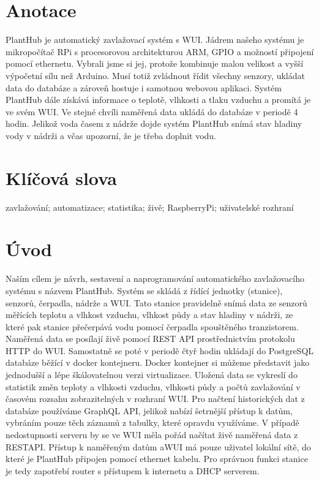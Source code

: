 \documentclass[12pt,a4paper]{article}
\begin{document}
\clearpage

\section*{Anotace}

PlantHub je automatický zavlažovací systém s \ac{WUI}.
Jádrem našeho systému je mikropočítač \ac{RPi} s procesorovou architekturou
\ac{ARM},
\ac{GPIO} a možností připojení pomocí ethernetu.
Vybrali jsme si jej, protože kombinuje malou velikost a vyšší výpočetní sílu
než Arduino. Musí totiž zvládnout řídit všechny senzory, ukládat data do
databáze a zároveň hostuje i samotnou webovou aplikaci. Systém PlantHub dále
získává informace o teplotě, vlhkosti a tlaku vzduchu a promítá je ve svém
\ac{WUI}. Ve stejné chvíli naměřená data ukládá do databáze v periodě 4
hodin. Jelikož voda časem z nádrže dojde systém PlantHub snímá stav hladiny
vody v nádrži a včas upozorní, že je třeba doplnit vodu.

\section*{Klíčová slova}

zavlažování; automatizace; statistika; živě; RaspberryPi; uživatelské rozhraní

\clearpage

\tableofcontents

\clearpage

\section{Úvod}


Naším cílem je návrh, sestavení a naprogramování automatického zavlažovacího systému s názvem PlantHub. Systém se skládá z řídící jednotky (stanice), senzorů, čerpadla, nádrže a \ac{WUI}. Tato stanice pravidelně snímá data ze senzorů měřících teplotu a vlhkost vzduchu, vlhkost půdy a stav hladiny v nádrži, ze které pak stanice přečerpává vodu pomocí čerpadla spouštěného tranzistorem. Naměřená data se posílají živě pomocí \ac{REST} \ac{API} prostřednictvím protokolu HTTP do \ac{WUI}. Samostatně se poté v periodě čtyř hodin ukládají do PostgreSQL databáze běžící v docker kontejneru. Docker kontejner si můžeme představit jako jednodušší a lépe škálovatelnou verzi virtualizace. Uložená data se vykreslí do statistik změn teploty a vlhkosti vzduchu, vlhkosti půdy a počtů zavlažování v časovém rozsahu zobrazitelných v rozhraní \ac{WUI}. Pro načtení historických dat z databáze používáme \ac{GraphQL} \ac{API}, jelikož nabízí šetrnější přístup k datům, vybráním pouze těch záznamů z tabulky, které opravdu využíváme. V případě nedostupnosti serveru by se ve \ac{WUI} měla pořád načítat živě naměřená data z \ac{REST}\ac{API}. Přístup k naměřeným datům a\ac{WUI} má pouze uživatel lokální sítě, do které je PlantHub připojen pomocí ethernet kabelu. Pro správnou funkci stanice je tedy zapotřebí router s přístupem k internetu a DHCP serverem.
\end{document}
